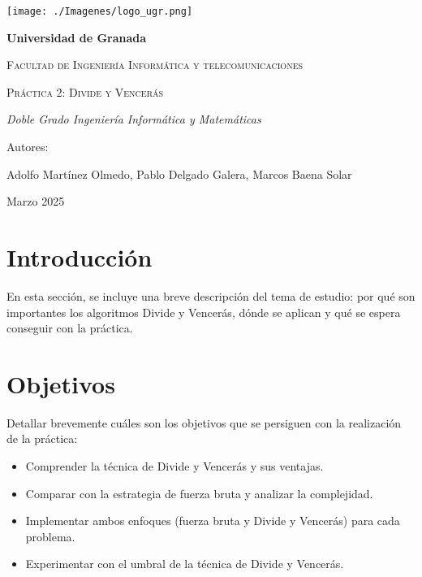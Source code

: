 \documentclass[a4paper,12pt]{article}
\begin{document}
\begin{titlepage}
	\centering

	\texttt{[image: ./Imagenes/logo\_ugr.png]} %
	\vspace{1cm} %

	{\bfseries\LARGE Universidad de Granada \par}
	\vspace{1cm}
	{\scshape\Large Facultad de Ingeniería Informática y telecomunicaciones \par}
	\vspace{3cm}
	{\scshape\Huge Práctica 2: Divide y Vencerás \par}
	\vspace{3cm}
	{\itshape\Large Doble Grado Ingeniería Informática y Matemáticas \par}
	\vfill
	{\Large Autores: \par}
	{\Large Adolfo Martínez Olmedo, Pablo Delgado Galera, Marcos Baena Solar \par}
	\vfill
	{\Large Marzo 2025 \par}
\end{titlepage}

\tableofcontents
\newpage


\section{Introducción}
En esta sección, se incluye una breve descripción del tema de estudio: 
por qué son importantes los algoritmos Divide y Vencerás, 
dónde se aplican y qué se espera conseguir con la práctica.

\section{Objetivos}
Detallar brevemente cuáles son los objetivos que se persiguen con la realización de la práctica:
\begin{itemize}
    \item Comprender la técnica de Divide y Vencerás y sus ventajas.
    \item Comparar con la estrategia de fuerza bruta y analizar la complejidad.
    \item Implementar ambos enfoques (fuerza bruta y Divide y Vencerás) para cada problema.
    \item Experimentar con el umbral de la técnica de Divide y Vencerás.
\end{itemize}
\end{document}
